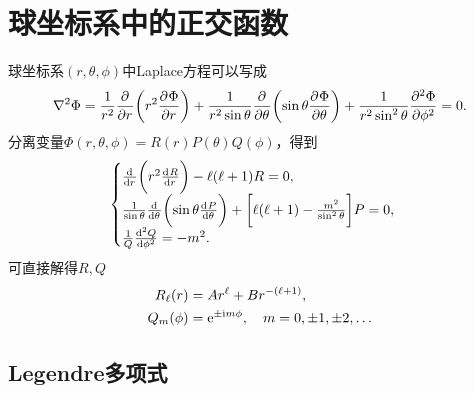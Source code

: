 \clearpage

\section{球坐标系中的正交函数}
\label{sec:laplace equation in spherical coordinate}

球坐标系$(r,\theta,\phi)$中Laplace方程可以写成
\begin{equation}
    \label{eqn:Laplace in spherical}
    \lap\Phi=\frac1{r^2}\pp r\biggkh{r^2\pv\Phi r}+\frac1{r^2\sin\theta}\pp\theta\biggkh{\sin\theta\pv\Phi\theta}+\frac1{r^2\sin^2\theta}\pv[2]\Phi\phi=0.
\end{equation}
分离变量$\Phi(r,\theta,\phi)=R(r)P(\theta)Q(\phi)$，得到 
\[
    \begin{cases}
        \dd r\biggkh{r^2\dv Rr}-\ell(\ell+1)R=0,\\
        \frac1{\sin\theta}\dd\theta\biggkh{\sin\theta\dv P\theta}+\biggfkh{\ell(\ell+1)-\frac{m^2}{\sin^2\theta}}P=0,\\
        \frac1Q\dv[2]Q\phi=-m^2.
    \end{cases}
\]
可直接解得$R,Q$
\begin{align}
    R_\ell(r)&=Ar^\ell+Br^{-(\ell+1)},\\
    Q_m(\phi)&=\e{\pm\i m\phi},\quad m=0,\pm 1,\pm 2,\ldots
\end{align}

\subsection{Legendre多项式}
\label{ssec:Legendre polynomial}

